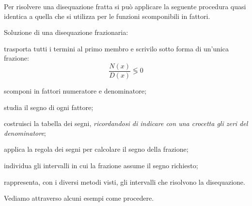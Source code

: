 Per risolvere una disequazione fratta si può applicare la seguente procedura
quasi identica a quella che si utilizza per le funzioni scomponibili in
fattori.

\begin{procedura}
Soluzione di una disequazione frazionaria:
\begin{enumeratea}
\item trasporta tutti i termini al primo membro e scrivilo sotto forma di
 un'unica frazione:\\
\[\frac{N(x)}{D(x)} \lessgtr 0\]
\item scomponi in fattori numeratore e denominatore;
\item studia il segno di ogni fattore;
\item costruisci la tabella dei segni,
\emph{ricordandosi di indicare con una crocetta gli zeri del denominatore};
\item applica la regola dei segni per calcolare il segno della frazione;
\item individua gli intervalli in cui la frazione assume il segno richiesto;
\item rappresenta, con i diversi metodi visti, gli intervalli che
 risolvono la disequazione.
\end{enumeratea}
\end{procedura}

Vediamo attraverso alcuni esempi come procedere.

